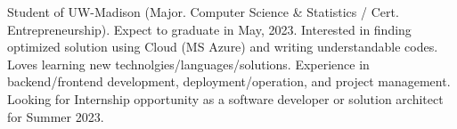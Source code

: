 

\begin{cvparagraph}

  Student of UW-Madison (Major. Computer Science \& Statistics / Cert. Entrepreneurship). Expect to graduate in May, 2023. Interested in finding optimized solution using Cloud (MS Azure) and writing understandable codes. Loves learning new technolgies/languages/solutions. Experience in backend/frontend development, deployment/operation, and project management.
  Looking for Internship opportunity as a software developer or solution architect for Summer 2023.
\end{cvparagraph}
